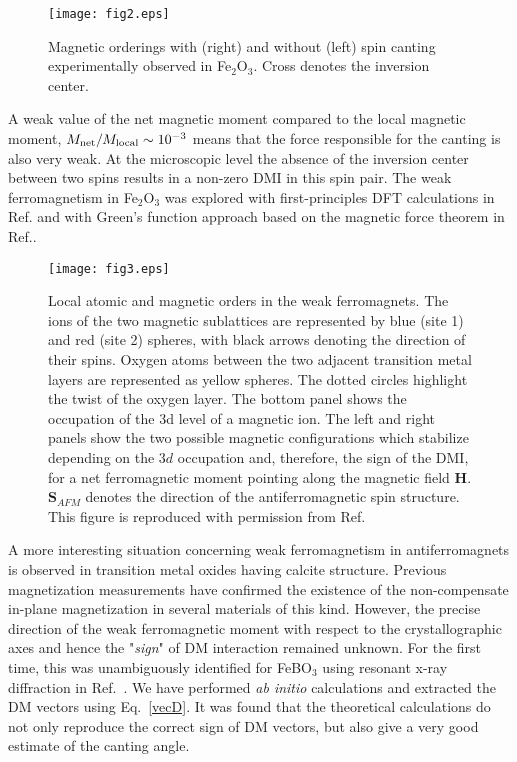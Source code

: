 \documentclass[aps,prl,twocolumn,showpacs,amsmath,amssymb]{revtex4-1}
\begin{document}
\begin{figure}[!ht]
\texttt{[image: fig2.eps]}
\caption{Magnetic orderings with (right) and without (left) spin canting experimentally observed in Fe$_2$O$_3$. Cross denotes the inversion center.}
\label{Fe2O3}
\end{figure}

A weak value of the net magnetic moment compared to the local magnetic moment, $M_{\rm net} / M_{\rm local} \sim 10^{-3}$ means that the force responsible for the canting is also very weak. At the microscopic level the absence of the inversion center between two spins results in a non-zero DMI in this spin pair. The weak ferromagnetism in Fe$_2$O$_3$ was explored with first-principles DFT calculations in Ref.\cite{Fe2O31} and with Green's function approach based on the magnetic force theorem in Ref.\cite{Fe2O32}.

\begin{figure}[!b]
\texttt{[image: fig3.eps]}
\caption{Local atomic and magnetic orders in the weak ferromagnets.
 The ions of the two magnetic sublattices are represented by blue (site 1) and red (site 2) spheres, with black arrows denoting the direction of their spins.
Oxygen atoms between the two adjacent transition metal layers are represented as yellow spheres. The dotted circles highlight the twist of the oxygen layer.
The bottom panel shows the occupation of the 3d level of a magnetic ion.
The left and right panels show the two possible magnetic configurations which stabilize depending on the $3d$ occupation and, therefore, the sign of the DMI, for a net ferromagnetic moment pointing along the magnetic field $\mathbf{H}$.
 $\mathbf{S}_{AFM}$ denotes the direction of the antiferromagnetic spin structure. This figure is reproduced with permission from Ref.\cite{carbonates}}
 \label{FIG1}
\end{figure}

A more interesting situation concerning weak ferromagnetism in antiferromagnets is observed in transition metal oxides having calcite structure.
Previous magnetization measurements \cite{Kosterov2006, Petrov, Borovik1961,Kreines} have confirmed the existence of the non-compensate in-plane magnetization in several materials of this kind. However, the precise direction of the weak ferromagnetic moment with respect to the crystallographic axes and hence the "\textit{sign}" of DM interaction remained unknown. 
For the first time, this was unambiguously identified for FeBO$_3$ using resonant x-ray diffraction in Ref.~\cite{dmitrienko-natphys}.
We have performed \textit{ab initio} calculations and extracted the DM vectors using Eq.~\ref{vecD}. It was found that the theoretical calculations do not only reproduce the correct sign of DM vectors, but also give a very good estimate of the canting angle.
\end{document}
